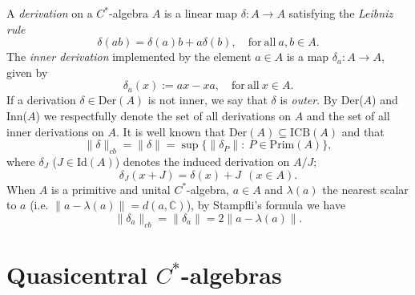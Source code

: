 \documentclass[]{amsart}
\theoremstyle{remark}
\theoremstyle{definition}
\theoremstyle{question}
\numberwithin{equation}{section}
\begin{document}
A \textit{derivation} on a $C^*$-algebra $A$ is a linear map $\delta : A \to A$
satisfying the \textit{Leibniz rule}
\begin{equation}\label{Leibniz}
\delta(ab)=\delta(a)b + a \delta(b), \quad \mathrm{for} \ \mathrm{all} \ a,b \in
A.
\end{equation}
The \textit{inner derivation} implemented by the element $a \in A$ is a map
$\delta_a : A \to A$, given by $$\delta_a (x):=ax-xa, \quad \mathrm{for }\
\mathrm{all} \  x \in A.$$
If a derivation $\delta \in \mathrm{Der}(A)$ is not inner, we say that $\delta$ is \textit{outer}.
By Der($A$) and Inn($A$) we respectfully denote the set of all derivations on $A$ and the set of all inner derivations on $A$.
It is well known that
$\mathrm{Der}(A) \subseteq \mathrm{ICB}(A)$ and
that
$$
\|\delta\|_{cb}=\|\delta\|=\sup \{\|\delta_P\| : \ P \in \mathrm{Prim}(A) \},
$$
where $\delta_J$ ($J \in \mathrm{Id}(A)$) denotes the induced derivation
on $A/J$; $$\delta_J(x+J)=\delta(x)+J \ \ (x \in A).$$
When $A$ is a primitive and unital $C^*$-algebra, $a \in A$ and $\lambda(a)$ the nearest scalar to $a$ (i.e. $\|a- \lambda(a)\|=d(a,{\mathbb{C}})$), by Stampfli's formula \cite[4.1.17]{Ara} we have
\begin{equation}\label{Stampfli}
\|\delta_a\|_{cb}=\|\delta_a\|=2\|a-\lambda(a)\|.
\end{equation}

\section{Quasicentral $C^*$-algebras}
\end{document}
